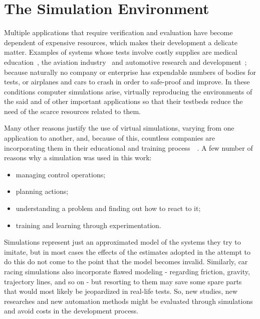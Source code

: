 \section{\textbf{The Simulation Environment}} \label{sec:Environment}

	Multiple applications that require verification and evaluation have become dependent of expensive resources, which makes their development a delicate matter. Examples of systems whose tests involve costly supplies are medical education~\cite{MEDIC}, the aviation industry~\cite{AIR} and automotive research and development~\cite{AUTR}; because naturally no company or enterprise has expendable numbers of bodies for tests, or airplanes and cars to crash in order to safe-proof and improve. In these conditions computer simulations arise, virtually reproducing the environments of the said and of other important applications so that their testbeds reduce the need of the scarce resources related to them.
	
	Many other reasons justify the use of virtual simulations, varying from one application to another, and, because of this, countless companies are incorporating them in their educational and training process~\cite{Simulation}~\cite{Operator}. A few number of reasons why a simulation was used in this work:
	
	\begin{itemize}
		
		\item managing control operations;
		
		\item planning actions;
		
		\item understanding a problem and finding out how to react to it;
		
		\item training and learning through experimentation.
		
	\end{itemize}
	
	Simulations represent just an approximated model of the systems they try to imitate, but in most cases the effects of the estimates adopted in the attempt to do this do not come to the point that the model becomes invalid. Similarly, car racing simulations also incorporate flawed modeling - regarding friction, gravity, trajectory lines, and so on - but resorting to them may save some spare parts that would most likely be jeopardized in real-life tests. So, new studies, new researches and new automation methods might be evaluated through simulations and avoid costs in the development process.
	
